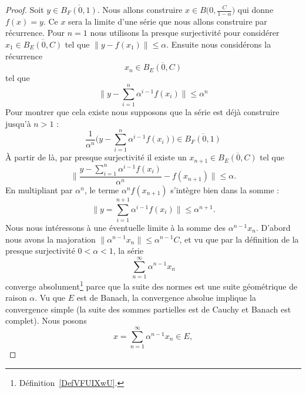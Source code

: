\begin{proof}
    Soit \( y\in \overline{ B_F(0,1) }\). Nous allons construire \( x\in B\big( 0,\frac{ C }{ 1-\alpha } \big)\) qui donne \( f(x)=y\). Ce \( x\) sera la limite d'une série que nous allons construire par récurrence. Pour \( n=1\) nous utilisons la presque surjectivité pour considérer \( x_1\in\overline{ B_E(0,C) } \) tel que \( \| y-f(x_1) \|\leq \alpha\). Ensuite nous considérons la récurrence
    \begin{equation}
        x_n\in \overline{ B_E(0,C) }
    \end{equation}
    tel que
    \begin{equation}
        \big\| y-\sum_{i=1}^n\alpha^{i-1}f(x_i) \big\|\leq \alpha^n
    \end{equation}
    Pour montrer que cela existe nous supposons que la série est déjà construire jusqu'à \( n>1\) :
    \begin{equation}
        \frac{1}{ \alpha^n }\Big( y-\sum_{i=1}^n\alpha^{i-1}f(x_i) \Big)\in \overline{ B_F(0,1) }
    \end{equation}
    À partir de là, par presque surjectivité il existe un \( x_{n+1}\in \overline{ B_E(0,C) }\) tel que
    \begin{equation}
        \big\| \frac{ y-\sum_{i=1}^n\alpha^{i-1}f(x_i) }{ \alpha^n }-f(x_{n+1}) \big\|\leq \alpha.
    \end{equation}
    En multipliant par \( \alpha^{n}\), le terme \( \alpha^nf(x_{n+1})\) s'intègre bien dans la somme :
    \begin{equation}
        \big\| y=\sum_{i=1}^{n+1}\alpha^{i-1}f(x_i) \big\|\leq \alpha^{n+1}.
    \end{equation}
    Nous nous intéressons à une éventuelle limite à la somme des \( \alpha^{n-1}x_n\). D'abord nous avons la majoration \( \| \alpha^{n-1}x_n \|\leq \alpha^{n-1}C\), et vu que par la définition de la presque surjectivité \( 0<\alpha<1\), la série
    \begin{equation}
        \sum_{n=1}^{\infty}\alpha^{n-1}x_n
    \end{equation}
    converge absolument\footnote{Définition~\ref{DefVFUIXwU}.} parce que la suite des normes est une suite géométrique de raison \( \alpha\). Vu que \( E\) est de Banach, la convergence absolue implique la convergence simple (la suite des sommes partielles est de Cauchy et Banach est complet). Nous posons
    \begin{equation}
        x=\sum_{n=1}^{\infty}\alpha^{n-1}x_n\in E,
    \end{equation}

\end{proof}
